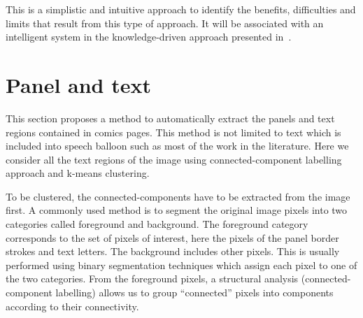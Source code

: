 This is a simplistic and intuitive approach to identify the benefits, difficulties and limits that result from this type of approach.
It will be associated with an intelligent system in the knowledge-driven approach presented in~.



\section{Panel and text} %
\label{sec:se:panel_and_text}


This section proposes a method to automatically extract the panels and text regions contained in comics pages.
This method is not limited to text which is included into speech balloon such as most of the work in the literature.
Here we consider all the text regions of the image using connected-component labelling approach and k-means clustering.


To be clustered, the connected-components have to be extracted from the image first.
A commonly used method is to segment the original image pixels into two categories called foreground and background.
The foreground category corresponds to the set of pixels of interest, here the pixels of the panel border strokes and text letters.
The background includes other pixels.
This is usually performed using binary segmentation techniques which assign each pixel to one of the two categories.
From the foreground pixels, a structural analysis (connected-component labelling) allows us to group ``connected'' pixels into components according to their connectivity.

